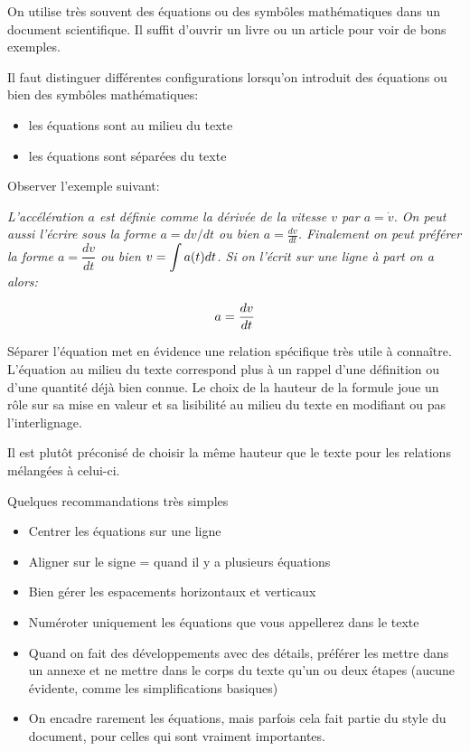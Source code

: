 
On utilise très souvent des équations ou des symbôles mathématiques  dans un document scientifique. 
Il suffit d'ouvrir  un livre ou un article pour voir de bons exemples. 

Il faut distinguer différentes configurations lorsqu'on introduit des équations ou bien des symbôles mathématiques:

\begin{itemize}
\item les équations sont au milieu du texte
\item les équations sont séparées du texte
\end{itemize}



Observer l'exemple suivant:


\textit{
L'accélération $a$ est définie comme la dérivée de la vitesse $v$ par $a = \dot v$. On peut aussi l'écrire sous la forme
$a = dv/dt$ ou bien $a = \frac{dv}{dt}$. Finalement on peut préférer la forme $a =\dfrac{dv}{dt}$ ou bien $\displaystyle v = \int a(t) dt$.
Si on l'écrit sur une ligne à part on a alors:
}

\begin{equation}
\displaystyle a = \frac{ d v }{ d t}
\label{eq:acceleration}
\end{equation}



Séparer l'équation met en évidence une relation spécifique très utile à connaître. L'équation au milieu du texte correspond plus à
un rappel d'une définition ou d'une quantité déjà bien connue. Le choix de la hauteur de la formule joue un rôle sur sa mise en valeur
et sa lisibilité au milieu du texte en modifiant ou pas l'interlignage.

Il est plutôt préconisé de choisir la même hauteur que le texte pour les relations mélangées à celui-ci.
 




Quelques recommandations très simples 

\begin{itemize}
\item Centrer les équations sur une ligne
\item Aligner sur le signe = quand il y a plusieurs équations
\item Bien gérer les espacements horizontaux et verticaux
\item Numéroter uniquement les équations que vous appellerez dans le texte
\item Quand on fait des développements avec des détails, préférer les mettre dans un annexe et ne mettre dans le corps du texte qu'un ou deux étapes (aucune évidente, comme les simplifications basiques)
\item On encadre rarement les équations, mais parfois cela fait partie du style du document, pour celles qui sont vraiment importantes.
\end{itemize}

